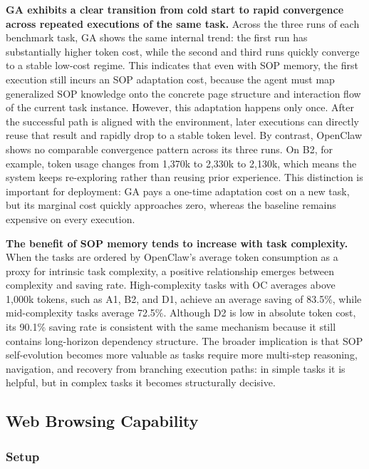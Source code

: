 \textbf{GA exhibits a clear transition from cold start to rapid convergence across repeated executions of the same task.} Across the three runs of each benchmark task, GA shows the same internal trend: the first run has substantially higher token cost, while the second and third runs quickly converge to a stable low-cost regime. This indicates that even with SOP memory, the first execution still incurs an SOP adaptation cost, because the agent must map generalized SOP knowledge onto the concrete page structure and interaction flow of the current task instance. However, this adaptation happens only once. After the successful path is aligned with the environment, later executions can directly reuse that result and rapidly drop to a stable token level. By contrast, OpenClaw shows no comparable convergence pattern across its three runs. On B2, for example, token usage changes from 1,370k to 2,330k to 2,130k, which means the system keeps re-exploring rather than reusing prior experience. This distinction is important for deployment: GA pays a one-time adaptation cost on a new task, but its marginal cost quickly approaches zero, whereas the baseline remains expensive on every execution.

\textbf{The benefit of SOP memory tends to increase with task complexity.} When the tasks are ordered by OpenClaw's average token consumption as a proxy for intrinsic task complexity, a positive relationship emerges between complexity and saving rate. High-complexity tasks with OC averages above 1,000k tokens, such as A1, B2, and D1, achieve an average saving of 83.5\%, while mid-complexity tasks average 72.5\%. Although D2 is low in absolute token cost, its 90.1\% saving rate is consistent with the same mechanism because it still contains long-horizon dependency structure. The broader implication is that SOP self-evolution becomes more valuable as tasks require more multi-step reasoning, navigation, and recovery from branching execution paths: in simple tasks it is helpful, but in complex tasks it becomes structurally decisive.

\subsection{Web Browsing Capability}
\label{sec:exp_browsing}

\subsubsection{Setup}
\label{sec:exp_browsing_setup}

